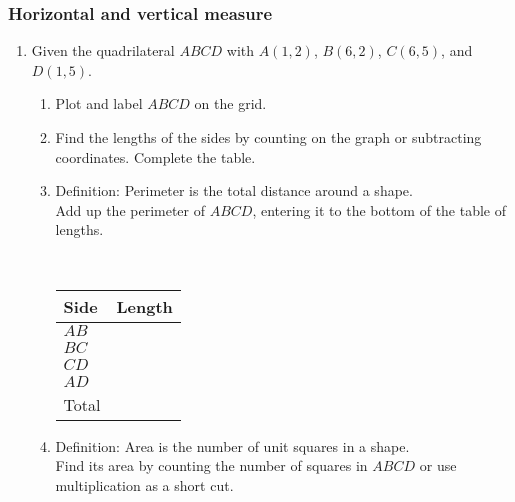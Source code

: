 \documentclass[12pt, twoside]{article}
\begin{document}
\newpage
\subsubsection*{Horizontal and vertical measure}
\begin{enumerate}

  \item Given the quadrilateral $ABCD$ with $A(1,2)$, $B(6,2)$, $C(6,5)$, and $D(1,5)$.
    \begin{enumerate}
      \item Plot and label $ABCD$ on the grid.
      \item Find the lengths of the sides by counting on the graph or subtracting coordinates. Complete the table.
      \item Definition: Perimeter is the total distance around a shape.\\[0.25cm]
      Add up the perimeter of $ABCD$, entering it to the bottom of the table of lengths.\\
        \begin{multicols}{2}
          \\
          \renewcommand{\arraystretch}{1.5}
          \begin{flushright}
          \begin{tabular}{|p{1cm}|p{2cm}|}
            \hline
            Side & Length \\
            \hline
            $AB$ & \\
            \hline
            $BC$ & \\
            \hline
            $CD$ & \\
            \hline
            $AD$ & \\
            \hline
            Total & \\
            \hline
          \end{tabular}
        \end{flushright}
        \end{multicols}
      \item Definition: Area is the number of unit squares in a shape. \\[0.25cm]
      Find its area by counting the number of squares in $ABCD$ or use multiplication as a short cut.
    \end{enumerate}


\end{enumerate}
\end{document}
